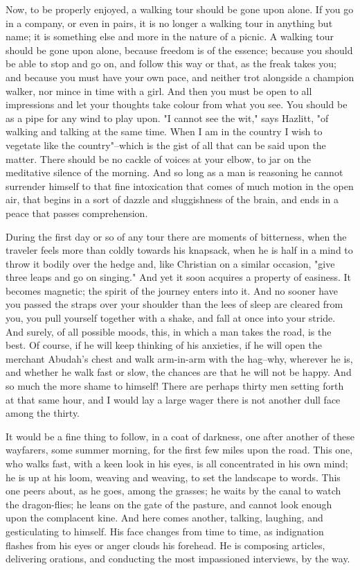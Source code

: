 {Now, to be properly enjoyed, a walking tour should be gone upon alone. If you go in a company, or even in pairs, it is no longer a walking tour in anything but name; it is something else and more in the nature of a picnic. A walking tour should be gone upon alone, because freedom is of the essence; because you should be able to stop and go on, and follow this way or that, as the freak takes you; and because you must have your own pace, and neither trot alongside a champion walker, nor mince in time with a girl. And then you must be open to all impressions and let your thoughts take colour from what you see. You should be as a pipe for any wind to play upon. "I cannot see the wit," says Hazlitt, "of walking and talking at the same time. When I am in the country I wish to vegetate like the country"--which is the gist of all that can be said upon the matter. There should be no cackle of voices at your elbow, to jar on the meditative silence of the morning. And so long as a man is reasoning he cannot surrender himself to that fine intoxication that comes of much motion in the open air, that begins in a sort of dazzle and sluggishness of the brain, and ends in a peace that passes comprehension.

During the first day or so of any tour there are moments of bitterness, when the traveler feels more than coldly towards his knapsack, when he is half in a mind to throw it bodily over the hedge and, like Christian on a similar occasion, "give three leaps and go on singing." And yet it soon acquires a property of easiness. It becomes magnetic; the spirit of the journey enters into it. And no sooner have you passed the straps over your shoulder than the lees of sleep are cleared from you, you pull yourself together with a shake, and fall at once into your stride. And surely, of all possible moods, this, in which a man takes the road, is the best. Of course, if he will keep thinking of his anxieties, if he will open the merchant Abudah's chest and walk arm-in-arm with the hag--why, wherever he is, and whether he walk fast or slow, the chances are that he will not be happy. And so much the more shame to himself! There are perhaps thirty men setting forth at that same hour, and I would lay a large wager there is not another dull face among the thirty.

It would be a fine thing to follow, in a coat of darkness, one after another of these wayfarers, some summer morning, for the first few miles upon the road. This one, who walks fast, with a keen look in his eyes, is all concentrated in his own mind; he is up at his loom, weaving and weaving, to set the landscape to words. This one peers about, as he goes, among the grasses; he waits by the canal to watch the dragon-flies; he leans on the gate of the pasture, and cannot look enough upon the complacent kine. And here comes another, talking, laughing, and gesticulating to himself. His face changes from time to time, as indignation flashes from his eyes or anger clouds his forehead. He is composing articles, delivering orations, and conducting the most impassioned interviews, by the way.

}
